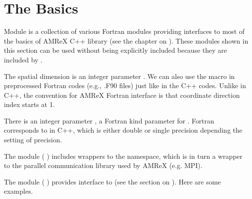 \documentclass[letterpaper,10pt,english]{sphinxmanual}
\begin{document}
\section{The Basics}
\label{\detokenize{Fortran:the-basics}}\label{\detokenize{Fortran:sec-fi-basics}}
\sphinxAtStartPar
Module  is a collection of various Fortran modules
providing interfaces to most of the basics of AMReX C++ library (see the
chapter on {\hyperref[\detokenize{Basics_Chapter:chap-basics}]{}}). These modules shown in this section can be used
without being explicitly included because they are included by
.

\sphinxAtStartPar
The spatial dimension is an integer parameter .  We
can also use the  macro in preprocessed Fortran codes
(e.g., .F90 files) just like in the C++ codes. Unlike in C++, the convention
for AMReX Fortran interface is that coordinate direction index starts at 1.

\sphinxAtStartPar
There is an integer parameter , a Fortran kind parameter
for . Fortran  corresponds to
 in C++, which is either double or single precision depending
the setting of precision.

\sphinxAtStartPar
The module  (
) includes wrappers to the
 namespace, which is in turn a wrapper to the parallel
communication library used by AMReX (e.g. MPI).

\sphinxAtStartPar
The module  (
) provides interface to
 (see the section on {\hyperref[\detokenize{Basics:sec-basics-parmparse}]{}}). Here are some
examples.
\end{document}
